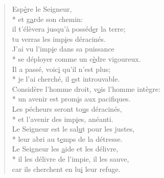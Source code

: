 \begin{verse}
Esp\underline{è}re le Seigneur, \\*
et g\underline{a}rde son chemin: \\
il t’élèvera jusqu’à posséd\underline{e}r la terre; \\
tu verras les imp\underline{i}es déracinés. \\

J’ai vu l’imp\underline{i}e dans sa puissance \\*
se déployer comme un c\underline{è}dre vigoureux. \\
Il a passé, voic\underline{i} qu’il n’est plus; \\*
je l’ai cherché, il \underline{e}st introuvable. \\

Considère l’homme droit, v\underline{o}is l’homme intègre: \\*
un avenir est prom\underline{i}s aux pacifiques. \\
Les pécheurs seront to\underline{u}s déracinés, \\*
et l’avenir des imp\underline{i}es, anéanti. \\

Le Seigneur est le sal\underline{u}t pour les justes, \\*
leur abri au t\underline{e}mps de la détresse. \\
Le Seigneur les \underline{a}ide et les délivre, \\*
il les délivre de l’impie, il les sauve, \\
car ils cherchent en lu\underline{i} leur refuge. \\
\end{verse}

